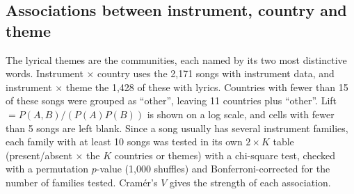 \subsection*{Associations between instrument, country and theme}
The lyrical themes are the \Glyr{} communities, each named by its two most distinctive words. Instrument $\times$ country uses the 2,171 songs with instrument data, and instrument $\times$ theme the 1,428 of these with lyrics. Countries with fewer than 15 of these songs were grouped as ``other'', leaving 11 countries plus ``other''. Lift $= P(A,B)/(P(A)P(B))$ is shown on a log scale, and cells with fewer than 5 songs are left blank. Since a song usually has several instrument families, each family with at least 10 songs was tested in its own $2 \times K$ table (present/absent $\times$ the $K$ countries or themes) with a chi-square test, checked with a permutation $p$-value (1,000 shuffles) and Bonferroni-corrected for the number of families tested. Cram\'er's $V$ gives the strength of each association.

